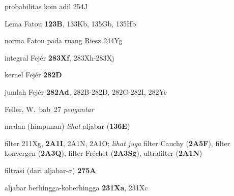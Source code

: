 \indexmedskip




probabilitas koin adil 254J










Lema Fatou {\bf 123B}, 133Kb, 135Gb, 135Hb

norma Fatou pada ruang Riesz 244Yg










integral Fej\'er {\bf 283Xf}, 283Xh-283Xj 


kernel Fej\'er {\bf 282D}


jumlah Fej\'er {\bf 282Ad}, 282B-282D, 
282G-282I, 
282Yc





Feller, W.\  bab\ 27 {\it pengantar}













medan (himpunan) {\it lihat} aljabar ({\bf 136E})

filter 211Xg, {\bf 2A1I}, 2A1N, 2A1O;  
  {\it lihat juga}
filter Cauchy ({\bf 2A5F}), filter konvergen ({\bf 2A3Q}), filter Fr\'echet ({\bf 2A3Sg}), ultrafilter ({\bf 2A1N})









filtrasi (dari aljabar-$\sigma$) {\bf 275A}











aljabar berhingga-koberhingga {\bf 231Xa}, 231Xc


















